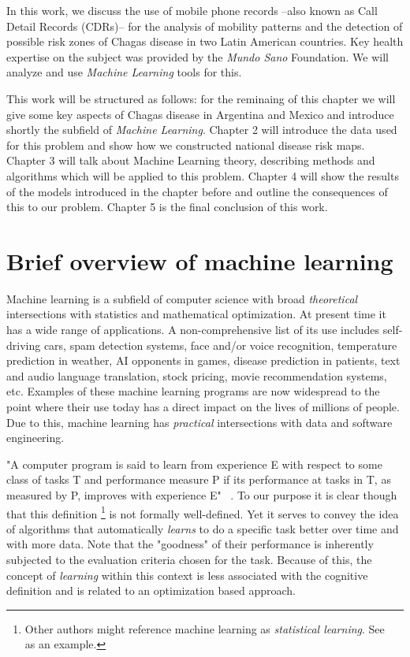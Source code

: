 In this work, we discuss the use of mobile phone records --also known as Call Detail Records (CDRs)-- for the analysis of mobility patterns and the detection of possible risk zones of Chagas disease in two Latin American countries. Key health expertise on the subject was provided by the \textit{Mundo Sano} Foundation. We will analyze and use  \textit{Machine Learning} tools for this. 

This work will be structured as follows: for the reminaing of this chapter we will give some key aspects of Chagas disease in Argentina and Mexico and introduce shortly the subfield of \textit{Machine Learning}. Chapter 2 will introduce the data used for this problem and show how we constructed national disease risk maps. Chapter 3 will talk about Machine Learning theory, describing methods and algorithms which will be applied to this problem. Chapter 4 will show the results of the models introduced in the chapter before and outline the consequences of this to our problem. Chapter 5 is the final conclusion of this work.


\section{Brief overview of machine learning}

Machine learning is a subfield of computer science with broad \textit{theoretical} intersections with statistics and mathematical optimization. At present time it has a wide range of applications. A non-comprehensive list of its use includes self-driving cars, spam detection systems, face and/or voice recognition, temperature prediction in weather, AI opponents in games, disease prediction in patients, text and audio language translation, stock pricing, movie recommendation systems, etc. Examples of these machine learning programs are now widespread to the point where their use today has a direct impact on the lives of millions of people. Due to this, machine learning has \textit{practical} intersections with data and software engineering.

"A computer program is said to learn from experience E with respect to some class of tasks T and performance measure P if its performance at tasks in T, as measured by P, improves with experience E" ~\textcite{Mitchell-MLearning}. To our purpose it is clear though that this definition \footnote{Other authors might reference machine learning as \textit{statistical learning}. See ~\textcite{hastie-elemstatslearn} as an example.} is not formally well-defined. Yet it serves to convey the idea of algorithms that automatically \textit{learns} to do a specific task better over time and with more data. Note that the "goodness" of their performance is inherently subjected to the evaluation criteria chosen for the task. Because of this, the concept of \textit{learning} within this context is less associated with the cognitive definition and is related to an optimization based approach.

